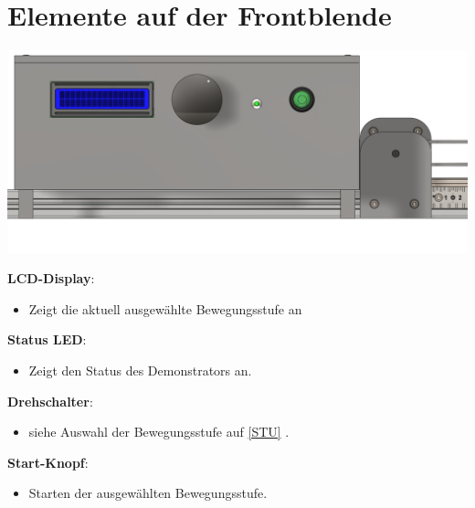 %
%

\chapter{Elemente auf der Frontblende}
\begin{center}
	
	\includegraphics[width=\textwidth]{Images/Konstruktion2.png}
\end{center}

	\textbf{LCD-Display}: 
\begin{itemize}
	\item Zeigt die aktuell ausgewählte Bewegungsstufe an
\end{itemize}

	\textbf{Status LED}: 
\begin{itemize}
	\item Zeigt den Status des Demonstrators an.
\end{itemize}

	\textbf{Drehschalter}: 
\begin{itemize}
	\item siehe \glqq Auswahl der Bewegungsstufe \grqq auf \ref{STU} . 
\end{itemize}

	\textbf{Start-Knopf}: 
\begin{itemize}
	\item Starten der ausgewählten Bewegungsstufe. 
\end{itemize}
